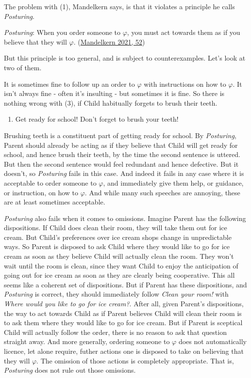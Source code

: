 \documentclass[
  12pt,
]{article}
\providecommand{\tightlist}{%
  \setlength{\itemsep}{0pt}\setlength{\parskip}{0pt}}
\begin{document}
The problem with (1), Mandelkern says, is that it violates a principle
he calls \emph{Posturing}.

\emph{Posturing}: When you order someone to \(\varphi\), you must act
towards them as if you believe that they will \(\varphi\).
(\protect\hyperlink{ref-Mandelkern2021}{Mandelkern 2021, 52})

But this principle is too general, and is subject to counterexamples.
Let's look at two of them.

It is sometimes fine to follow up an order to \(\varphi\) with
instructions on how to \(\varphi\). It isn't always fine - often it's
insulting - but sometimes it is fine. So there is nothing wrong with
(3), if Child habitually forgets to brush their teeth.

\begin{enumerate}
\def\labelenumi{(\arabic{enumi})}
\setcounter{enumi}{2}
\tightlist
\item
  Get ready for school! Don't forget to brush your teeth!
\end{enumerate}

Brushing teeth is a constituent part of getting ready for school. By
\emph{Posturing}, Parent should already be acting as if they believe
that Child will get ready for school, and hence brush their teeth, by
the time the second sentence is uttered. But then the second sentence
would feel redundant and hence defective. But it doesn't, so
\emph{Posturing} fails in this case. And indeed it fails in any case
where it is acceptable to order someone to \(\varphi\), and immediately
give them help, or guidance, or instruction, on how to \(\varphi\). And
while many such speeches are annoying, these are at least sometimes
acceptable.

\emph{Posturing} also fails when it comes to omissions. Imagine Parent
has the following dispositions. If Child does clean their room, they
will take them out for ice cream. But Child's preferences over ice cream
shops change in unpredictable ways. So Parent is disposed to ask Child
where they would like to go for ice cream as soon as they believe Child
will actually clean the room. They won't wait until the room is clean,
since they want Child to enjoy the anticipation of going out for ice
cream as soon as they are clearly being cooperative. This all seems like
a coherent set of dispositions. But if Parent has these dispositions,
and \emph{Posturing} is correct, they should immediately follow
\emph{Clean your room!} with \emph{Where would you like to go for ice
cream?}. After all, given Parent's dispositions, the way to act towards
Child as if Parent believes Child will clean their room is to ask them
where they would like to go for ice cream. But if Parent is sceptical
Child will actually follow the order, there is no reason to ask that
question straight away. And more generally, ordering someone to
\(\varphi\) does not automatically licence, let alone require, futher
actions one is disposed to take on believing that they will \(\varphi\).
The omission of those actions is completely appropriate. That is,
\emph{Posturing} does not rule out those omissions.
\end{document}
